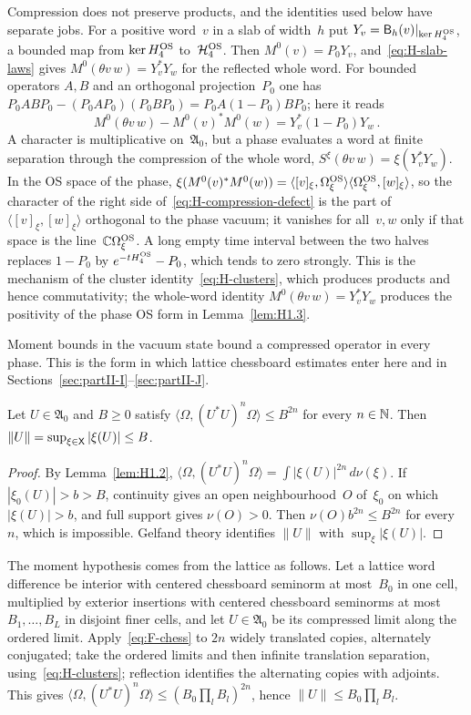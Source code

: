 Compression does not preserve products, and the identities used below have separate jobs. For a positive word~$v$ in a slab of width~$h$ put $Y_v=\mathsf B_h(v)|_{\ker H_4^{\rm OS}}$, a bounded map from $\ker H_4^{\rm OS}$ to~$\mathcal H_4^{\rm OS}$. Then $M^0(v)=P_0Y_v$, and~\eqref{eq:H-slab-laws} gives $M^0(\theta v\,w)=Y_v^*Y_w$ for the reflected whole word. For bounded operators $A,B$ and an orthogonal projection~$P_0$ one has $P_0ABP_0-(P_0AP_0)(P_0BP_0)=P_0A(1-P_0)BP_0$; here it reads
\begin{equation}\label{eq:H-compression-defect}
M^0(\theta v\,w)-M^0(v)^*M^0(w)=Y_v^*(1-P_0)Y_w\,.
\end{equation}
A character is multiplicative on~$\mathfrak A_0$, but a phase evaluates a word at finite separation through the compression of the whole word, $S^\xi(\theta v\,w)=\xi(Y_v^*Y_w)$. In the OS space of the phase, $\xi(M^0(v)^*M^0(w))=\langle[v]_\xi,\Omega_\xi^{\rm OS}\rangle\langle\Omega_\xi^{\rm OS},[w]_\xi\rangle$, so the character of the right side of~\eqref{eq:H-compression-defect} is the part of $\langle[v]_\xi,[w]_\xi\rangle$ orthogonal to the phase vacuum; it vanishes for all~$v,w$ only if that space is the line~$\mathbb{C}\Omega_\xi^{\rm OS}$. A long empty time interval between the two halves replaces $1-P_0$ by $e^{-tH_4^{\rm OS}}-P_0$, which tends to zero strongly. This is the mechanism of the cluster identity~\eqref{eq:H-clusters}, which produces products and hence commutativity; the whole-word identity $M^0(\theta v\,w)=Y_v^*Y_w$ produces the positivity of the phase OS form in Lemma~\ref{lem:H1.3}.

Moment bounds in the vacuum state bound a compressed operator in every phase. This is the form in which lattice chessboard estimates enter here and in Sections~\ref{sec:partII-I}--\ref{sec:partII-J}.
\begin{lemma}\label{lem:H-roots}
Let $U\in\mathfrak A_0$ and $B\ge0$ satisfy $\langle\Omega,(U^*U)^n\Omega\rangle\le B^{2n}$ for every $n\in\mathbb{N}$. Then $\|U\|=\sup_{\xi\in\mathsf{X}}|\xi(U)|\le B$.
\end{lemma}
\begin{proof}
By Lemma~\ref{lem:H1.2}, $\langle\Omega,(U^*U)^n\Omega\rangle=\int|\xi(U)|^{2n}\,d\nu(\xi)$. If $|\xi_0(U)|>b>B$, continuity gives an open neighbourhood~$O$ of~$\xi_0$ on which $|\xi(U)|>b$, and full support gives $\nu(O)>0$. Then $\nu(O)b^{2n}\le B^{2n}$ for every~$n$, which is impossible. Gelfand theory identifies $\|U\|$ with $\sup_\xi|\xi(U)|$.
\end{proof}
The moment hypothesis comes from the lattice as follows. Let a lattice word difference be interior with centered chessboard seminorm at most~$B_0$ in one cell, multiplied by exterior insertions with centered chessboard seminorms at most $B_1,\ldots,B_L$ in disjoint finer cells, and let $U\in\mathfrak A_0$ be its compressed limit along the ordered limit. Apply~\eqref{eq:F-chess} to $2n$ widely translated copies, alternately conjugated; take the ordered limits and then infinite translation separation, using~\eqref{eq:H-clusters}; reflection identifies the alternating copies with adjoints. This gives $\langle\Omega,(U^*U)^n\Omega\rangle\le(B_0\prod_lB_l)^{2n}$, hence $\|U\|\le B_0\prod_lB_l$.

